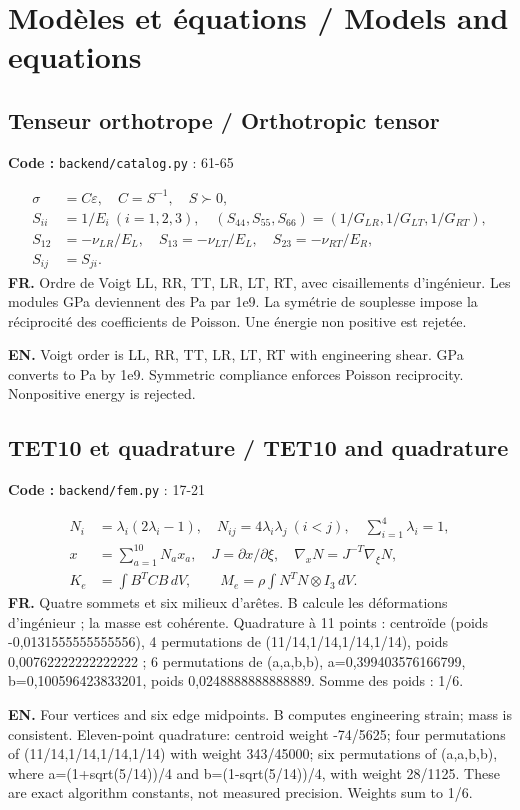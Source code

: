 \documentclass[10pt,a4paper]{article}
\newcommand{\FR}[1]{\textbf{FR.} #1\par}\newcommand{\EN}[1]{{\selectlanguage{english}\textbf{EN.} #1\par}}
\newcommand{\loc}[1]{{\small\color{ink}\textbf{Code :} #1\par}}
\begin{document}
\section{Modèles et équations / Models and equations}
\begin{samepage}\subsection{Tenseur orthotrope / Orthotropic tensor}
\loc{\texttt{backend/catalog.py} : 61-65}
\begin{align}\sigma&=C\varepsilon,\quad C=S^{-1},\quad S\succ0,\\
S_{ii}&=1/E_i\ (i=1,2,3),\quad (S_{44},S_{55},S_{66})=(1/G_{LR},1/G_{LT},1/G_{RT}),\\
S_{12}&=-\nu_{LR}/E_L,\quad S_{13}=-\nu_{LT}/E_L,\quad S_{23}=-\nu_{RT}/E_R,\\
S_{ij}&=S_{ji}.\end{align}
\FR{Ordre de Voigt LL, RR, TT, LR, LT, RT, avec cisaillements d’ingénieur. Les modules GPa deviennent des Pa par 1e9. La symétrie de souplesse impose la réciprocité des coefficients de Poisson. Une énergie non positive est rejetée.}
\EN{Voigt order is LL, RR, TT, LR, LT, RT with engineering shear. GPa converts to Pa by 1e9. Symmetric compliance enforces Poisson reciprocity. Nonpositive energy is rejected.}
\end{samepage}
\begin{samepage}\subsection{TET10 et quadrature / TET10 and quadrature}
\loc{\texttt{backend/fem.py} : 17-21}
\begin{align}N_i&=\lambda_i(2\lambda_i-1),\quad N_{ij}=4\lambda_i\lambda_j\ (i<j),\quad\sum_{i=1}^4\lambda_i=1,\\
x&=\sum_{a=1}^{10}N_ax_a,\quad J=\partial x/\partial\xi,\quad\nabla_xN=J^{-T}\nabla_\xi N,\\
K_e&=\int B^TCB\,dV,\qquad M_e=\rho\int N^TN\otimes I_3\,dV.\end{align}
\FR{Quatre sommets et six milieux d’arêtes. B calcule les déformations d’ingénieur ; la masse est cohérente. Quadrature à 11 points : centroïde (poids -0,0131555555555556), 4 permutations de (11/14,1/14,1/14,1/14), poids 0,00762222222222222 ; 6 permutations de (a,a,b,b), a=0,399403576166799, b=0,100596423833201, poids 0,0248888888888889. Somme des poids : 1/6.}
\EN{Four vertices and six edge midpoints. B computes engineering strain; mass is consistent. Eleven-point quadrature: centroid weight -74/5625; four permutations of (11/14,1/14,1/14,1/14) with weight 343/45000; six permutations of (a,a,b,b), where a=(1+sqrt(5/14))/4 and b=(1-sqrt(5/14))/4, with weight 28/1125. These are exact algorithm constants, not measured precision. Weights sum to 1/6.}
\end{samepage}
\end{document}
